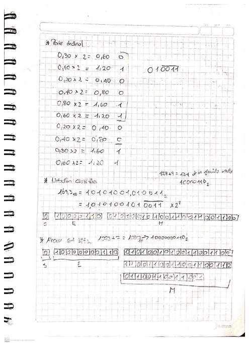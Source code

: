 \documentclass[12pt]{article}
\begin{document}
\begin{minipage}{0.95\textwidth}
    \raggedleft
    \includegraphics[width=0.95\textwidth]{inFiles/Figures/ej5.jpeg}
\end{minipage}

\vspace{0.5cm}
\end{document}
